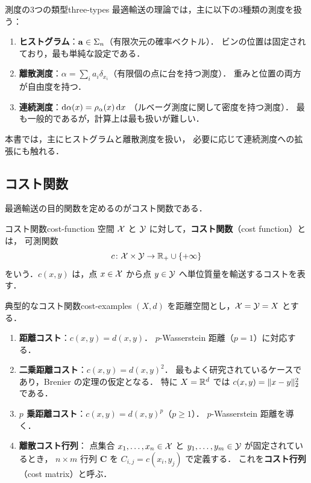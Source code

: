 \begin{remark}{測度の3つの類型}{three-types}
  最適輸送の理論では，主に以下の3種類の測度を扱う：
  \begin{enumerate}
    \item \textbf{ヒストグラム}：$\mathbf{a} \in \Sigma_n$（有限次元の確率ベクトル）．
      ビンの位置は固定されており，最も単純な設定である．
    \item \textbf{離散測度}：$\alpha = \sum_i a_i \delta_{x_i}$（有限個の点に台を持つ測度）．
      重みと位置の両方が自由度を持つ．
    \item \textbf{連続測度}：$\mathrm{d}\alpha(x) = \rho_\alpha(x) \, \mathrm{d} x$
      （ルベーグ測度に関して密度を持つ測度）．
      最も一般的であるが，計算上は最も扱いが難しい．
  \end{enumerate}
  本書では，主にヒストグラムと離散測度を扱い，
  必要に応じて連続測度への拡張にも触れる．
\end{remark}

\subsection{コスト関数}
\label{subsec:cost-function}

最適輸送の目的関数を定めるのがコスト関数である．

\begin{definition}{コスト関数}{cost-function}
  空間 $\mathcal{X}$ と $\mathcal{Y}$ に対して，\textbf{コスト関数}（cost function）とは，
  可測関数
  \[
    c \colon \mathcal{X} \times \mathcal{Y} \to \mathbb{R}_+ \cup \{+\infty\}
  \]
  をいう．$c(x, y)$ は，点 $x \in \mathcal{X}$ から点 $y \in \mathcal{Y}$ へ単位質量を輸送するコストを表す．
\end{definition}

\begin{example}{典型的なコスト関数}{cost-examples}
  $(X, d)$ を距離空間とし，$\mathcal{X} = \mathcal{Y} = X$ とする．
  \begin{enumerate}
    \item \textbf{距離コスト}：$c(x, y) = d(x, y)$．
      $p$-Wasserstein 距離（$p=1$）に対応する．
    \item \textbf{二乗距離コスト}：$c(x, y) = d(x, y)^2$．
      最もよく研究されているケースであり，Brenier の定理の仮定となる．
      特に $X = \mathbb{R}^d$ では $c(x,y) = \lVert x-y \rVert_2^2$ である．
    \item \textbf{$p$ 乗距離コスト}：$c(x, y) = d(x, y)^p$（$p \geq 1$）．
      $p$-Wasserstein 距離を導く．
    \item \textbf{離散コスト行列}：
      点集合 $x_1, \ldots, x_n \in \mathcal{X}$ と $y_1, \ldots, y_m \in \mathcal{Y}$ が固定されているとき，
      $n \times m$ 行列 $\mathbf{C}$ を $C_{i,j} = c(x_i, y_j)$ で定義する．
      これを\textbf{コスト行列}（cost matrix）と呼ぶ．
  \end{enumerate}
\end{example}

